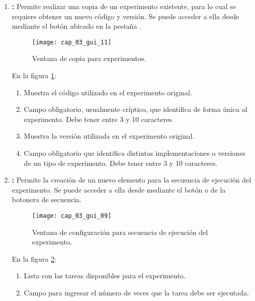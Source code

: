 \documentclass[\main/main.tex]{subfiles}
\begin{document}
\begin{enumerate}
				\item \textbf{:} Permite realizar una copia de un experimento existente, para lo cual se requiere obtener un nuevo código y versión. Se puede acceder a ella desde  mediante el botón  ubicado en la pestaña .
				\begin{figure}[H]
					\centering
					\texttt{[image: cap\_03\_gui\_11]}
					\caption{Ventana de copia para experimentos.}
					\label{fig:03_gui_exp_cpy}
				\end{figure}

				\vspace{-5mm}

				En la figura \ref{fig:03_gui_exp_cpy}:
				\begin{enumerate}[(1)]\setlength\itemsep{-0.5em}
					\item Muestra el código utilizado en el experimento original.
					\item Campo obligatorio, usualmente críptico, que identifica de forma única al experimento. Debe tener entre 3 y 10 caracteres.
					\item Muestra la versión utilizada en el experimento original.  
					\item Campo obligatorio que identifica distintas implementaciones o versiones de un tipo de experimento. Debe tener entre 3 y 10 caracteres.
				\end{enumerate}

				\item \textbf{:} Permite la creación de un nuevo elemento para la secuencia de ejecución del experimento. Se puede acceder a ella desde  mediante el botón  o  de la botonera de secuencia. 
				\begin{figure}[H]
					\centering
					\texttt{[image: cap\_03\_gui\_09]}
					\caption{Ventana de configuración para secuencia de ejecución del experimento.}
					\label{fig:03_gui_exp_seq}
				\end{figure}

				\vspace{-5mm}

				En la figura \ref{fig:03_gui_exp_seq}:
				\begin{enumerate}[(1)]\setlength\itemsep{-0.5em}
					\item Lista con las tareas disponibles para el experimento.
					\item Campo para ingresar el número de veces que la tarea debe ser ejecutada.
				\end{enumerate}


\end{enumerate}
\end{document}
